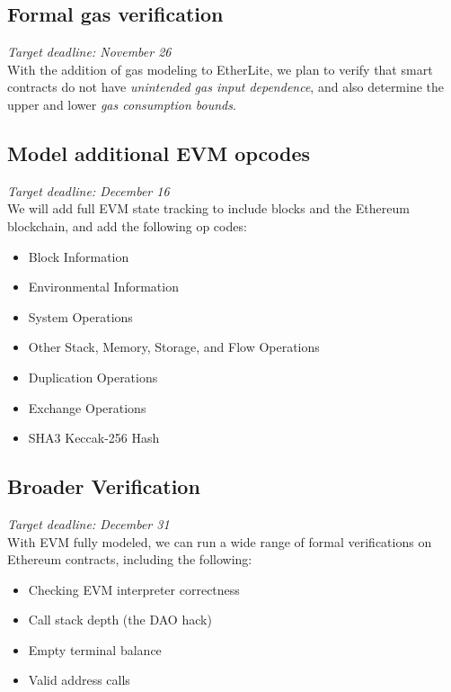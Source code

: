 \subsection{Formal gas verification}
\noindent\emph{Target deadline: November 26}\\[6pt]
With the addition of gas modeling to EtherLite, we plan to verify that smart
contracts do not have \textit{unintended gas input dependence}, and also
determine the upper and lower \textit{gas consumption bounds}.

\subsection{Model additional EVM opcodes}
\noindent\emph{Target deadline: December 16}\\[6pt]
We will add full EVM state tracking to include blocks and the Ethereum
blockchain, and add the following op codes:

\begin{itemize}
	\renewcommand\labelitemi{--}
	\itemsep0.2em
	\item Block Information
	\item Environmental Information
	\item System Operations
	\item Other Stack, Memory, Storage, and Flow Operations
	\item Duplication Operations
	\item Exchange Operations
	\item SHA3 Keccak-256 Hash
\end{itemize}

\subsection{Broader Verification}
\noindent\emph{Target deadline: December 31}\\[6pt]
With EVM fully modeled, we can run a wide range of formal verifications on
Ethereum contracts, including the following:

\begin{itemize}
	\renewcommand\labelitemi{--}
	\itemsep0.2em
	\item Checking EVM interpreter correctness
	\item Call stack depth (the DAO hack)
	\item Empty terminal balance 
	\item Valid address calls
\end{itemize}
